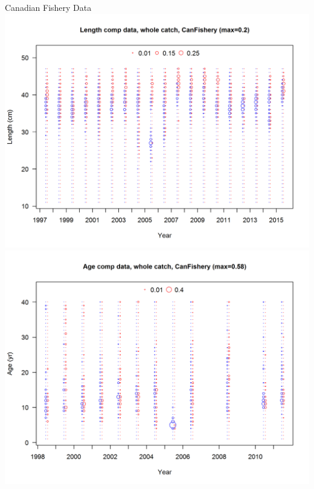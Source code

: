 \documentclass[pdf]{beamer}\usepackage[]{graphicx}\usepackage[]{color}
\begin{document}
\begin{frame}{Canadian Fishery Data}
  \includegraphics[scale = 0.37]{figures/CanadianFishery_LenData.png}
  \includegraphics[scale = 0.37]{figures/CanadianFishery_AgeData.png}
\end{frame}
\end{document}
